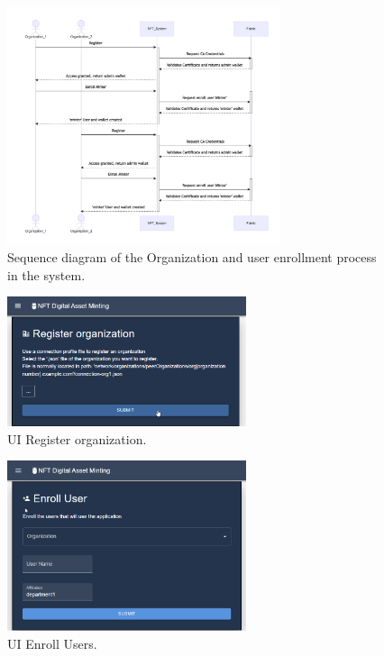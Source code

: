 \documentclass[a4paper]{article}
\begin{document}
 \begin{figure}[ht]
        \centering
        \includegraphics[width=8cm]{img/SequenceDiagram_RegisterEnroll.png}
        \caption{Sequence diagram of the Organization and user enrollment process in the system.}
        \label{fig:SeqDiag_RegisterEnroll}
    \end{figure}


 \begin{figure}[ht]
        \centering
        \includegraphics[width=7cm]{img/NFT_REGISTER.png}
        \caption{UI Register organization.}
        \label{fig:UI_Register}
    \end{figure}


 \begin{figure}[ht]
        \centering
        \includegraphics[width=7cm]{img/NFT_ENROLL.png}
        \caption{UI Enroll Users.}
        \label{fig:UI_Enroll}
    \end{figure}

\hfill \break
\end{document}
